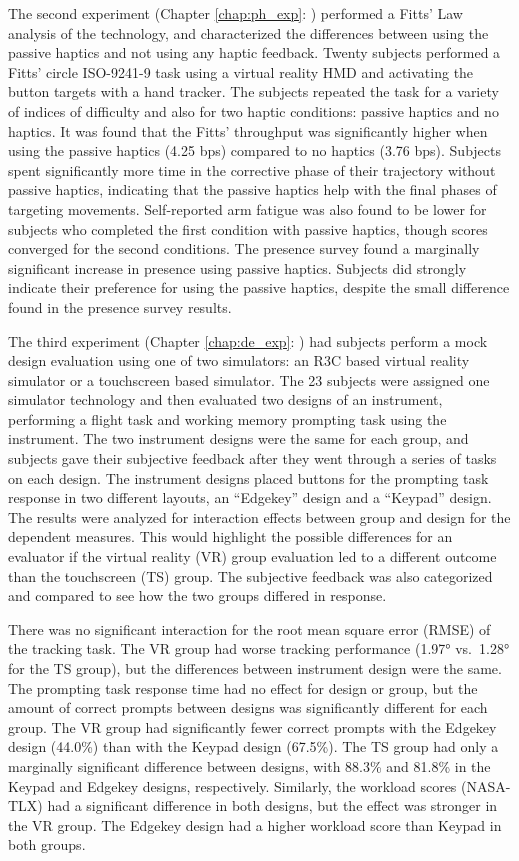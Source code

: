 The second experiment (Chapter \ref{chap:ph_exp}: ) performed a Fitts' Law analysis of the technology, and characterized the differences between using the passive haptics and not using any haptic feedback.
Twenty subjects performed a Fitts' circle ISO-9241-9 task using a virtual reality HMD and activating the button targets with a hand tracker.
The subjects repeated the task for a variety of indices of difficulty and also for two haptic conditions: passive haptics and no haptics.
It was found that the Fitts' throughput was significantly higher when using the passive haptics (4.25 bps) compared to no haptics (3.76 bps).
Subjects spent significantly more time in the corrective phase of their trajectory without passive haptics, indicating that the passive haptics help with the final phases of targeting movements.
Self-reported arm fatigue was also found to be lower for subjects who completed the first condition with passive haptics, though scores converged for the second conditions.
The presence survey found a marginally significant increase in presence using passive haptics.
Subjects did strongly indicate their preference for using the passive haptics, despite the small difference found in the presence survey results.

The third experiment (Chapter \ref{chap:de_exp}: ) had subjects perform a mock design evaluation using one of two simulators: an R3C based virtual reality simulator or a touchscreen based simulator.
The 23 subjects were assigned one simulator technology and then evaluated two designs of an instrument, performing a flight task and working memory prompting task using the instrument.
The two instrument designs were the same for each group, and subjects gave their subjective feedback after they went through a series of tasks on each design.
The instrument designs placed buttons for the prompting task response in two different layouts, an ``Edgekey'' design and a ``Keypad'' design.
The results were analyzed for interaction effects between group and design for the dependent measures.
This would highlight the possible differences for an evaluator if the virtual reality (VR) group evaluation led to a different outcome than the touchscreen (TS) group.
The subjective feedback was also categorized and compared to see how the two groups differed in response.

There was no significant interaction for the root mean square error (RMSE) of the tracking task.
The VR group had worse tracking performance (\ang{1.97} vs.\ \ang{1.28} for the TS group), but the differences between instrument design were the same.
The prompting task response time had no effect for design or group, but the amount of correct prompts between designs was significantly different for each group.
The VR group had significantly fewer correct prompts with the Edgekey design (44.0\%) than with the Keypad design (67.5\%).
The TS group had only a marginally significant difference between designs, with 88.3\% and 81.8\% in the Keypad and Edgekey designs, respectively.
Similarly, the workload scores (NASA-TLX) had a significant difference in both designs, but the effect was stronger in the VR group.
The Edgekey design had a higher workload score than Keypad in both groups.

